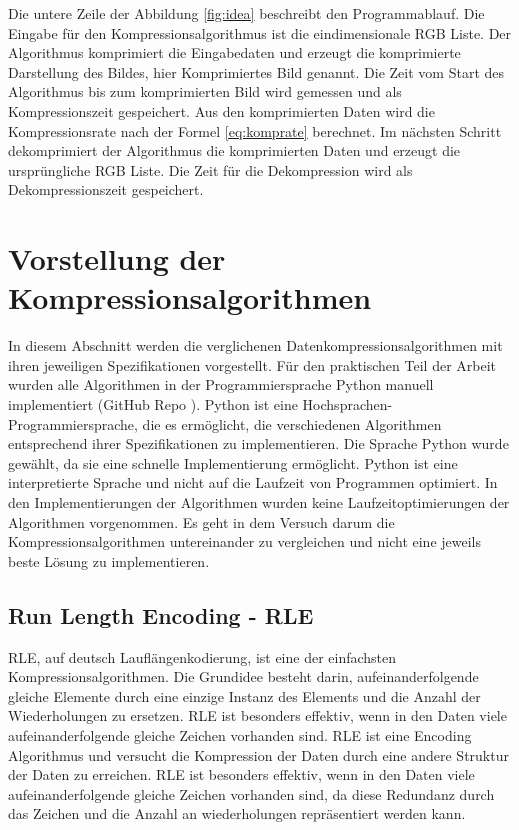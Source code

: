 \documentclass[conference]{IEEEtran}
\begin{document}
Die untere Zeile der Abbildung \ref{fig:idea} beschreibt den Programmablauf. 
Die Eingabe für den Kompressionsalgorithmus ist die eindimensionale RGB Liste. 
Der Algorithmus komprimiert die Eingabedaten und erzeugt die komprimierte 
Darstellung des Bildes, hier Komprimiertes Bild genannt. 
Die Zeit vom Start des Algorithmus bis zum komprimierten Bild wird gemessen 
und als Kompressionszeit gespeichert. 
Aus den komprimierten Daten wird die Kompressionsrate nach der 
Formel \ref{eq:komprate} berechnet. 
Im nächsten Schritt dekomprimiert der Algorithmus die komprimierten Daten 
und erzeugt die ursprüngliche RGB Liste. 
Die Zeit für die Dekompression wird als Dekompressionszeit gespeichert.




\section{Vorstellung der Kompressionsalgorithmen}

In diesem Abschnitt werden die verglichenen Datenkompressionsalgorithmen
mit ihren jeweiligen Spezifikationen vorgestellt.
Für den praktischen Teil der Arbeit wurden alle
Algorithmen in der Programmiersprache Python manuell implementiert
(GitHub Repo \cite{nick}).
Python ist eine Hochsprachen-Programmiersprache, die es ermöglicht,
die verschiedenen Algorithmen entsprechend ihrer Spezifikationen zu implementieren.
Die Sprache Python wurde gewählt, da sie eine schnelle Implementierung ermöglicht.
Python ist eine interpretierte Sprache und nicht auf die Laufzeit von Programmen
optimiert. \cite{nadav}
In den Implementierungen der Algorithmen wurden keine Laufzeitoptimierungen der
Algorithmen vorgenommen.
Es geht in dem Versuch darum die Kompressionsalgorithmen untereinander zu
vergleichen und nicht eine jeweils beste Lösung zu implementieren.


\subsection{Run Length Encoding - RLE}

RLE, auf deutsch Lauflängenkodierung, ist eine der einfachsten Kompressionsalgorithmen.
Die Grundidee besteht darin, aufeinanderfolgende gleiche Elemente durch
eine einzige Instanz des Elements und die Anzahl der Wiederholungen zu ersetzen.
RLE ist besonders effektiv, wenn in den Daten viele aufeinanderfolgende
gleiche Zeichen vorhanden sind.
RLE ist eine Encoding Algorithmus und versucht die Kompression der Daten
durch eine andere Struktur der Daten zu erreichen.
RLE ist besonders effektiv, wenn in den Daten viele aufeinanderfolgende
gleiche Zeichen vorhanden sind, da diese Redundanz durch das Zeichen und die
Anzahl an wiederholungen repräsentiert werden kann.
\end{document}
